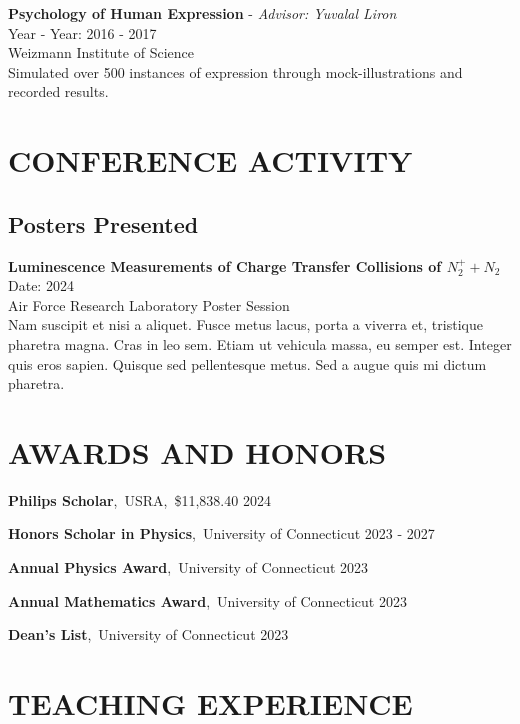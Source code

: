 \documentclass[a4paper,9pt]{extarticle}
\begin{document}
\noindent
\textbf{Psychology of Human Expression} - \textit{Advisor: Yuvalal Liron} \\
Year - Year: 2016 - 2017 \\
Weizmann Institute of Science\\
Simulated over 500 instances of expression through mock-illustrations and recorded results.


\section*{CONFERENCE ACTIVITY}

\subsection*{Posters Presented}
\textbf{Luminescence Measurements of Charge Transfer Collisions of $N^+_2 + N_2$} \\
Date: 2024 \\
Air Force Research Laboratory Poster Session \\
Nam suscipit et nisi a aliquet. Fusce metus lacus, porta a viverra et, tristique pharetra magna. Cras in leo sem. Etiam ut vehicula massa, eu semper est. Integer quis eros sapien. Quisque sed pellentesque metus. Sed a augue quis mi dictum pharetra.


\section*{AWARDS AND HONORS}

\noindent
\textbf{Philips Scholar},\ USRA,\ \$11,838.40 \hfill 2024

\noindent
\textbf{Honors Scholar in Physics},\ University of Connecticut \hfill 2023 - 2027

\noindent
\textbf{Annual Physics Award},\ University of Connecticut \hfill 2023 

\noindent
\textbf{Annual Mathematics Award},\ University of Connecticut \hfill 2023

\noindent
\textbf{Dean's List},\ University of Connecticut \hfill 2023


\section*{TEACHING EXPERIENCE}
\end{document}
